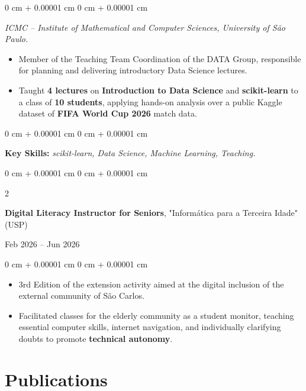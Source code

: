 \documentclass[10pt, letterpaper]{article}
\newenvironment{highlights}{
    \begin{itemize}[
        topsep=0.10 cm,
        parsep=0.10 cm,
        partopsep=0pt,
        itemsep=0pt,
        leftmargin=0 cm + 10pt
    ]
}{
    \end{itemize}
} %
\newenvironment{onecolentry}{
    \begin{adjustwidth}{
        0 cm + 0.00001 cm
    }{
        0 cm + 0.00001 cm
    }
}{
    \end{adjustwidth}
} %
\newenvironment{twocolentry}[2][]{
    \onecolentry
    \def\secondColumn{#2}
    \setcolumnwidth{\fill, 4.5 cm}
    \begin{paracol}{2}
}{
    \switchcolumn \raggedleft \secondColumn
    \end{paracol}
    \endonecolentry
} %
\begin{document}
\vspace{0.10 cm}
\begin{onecolentry}
    \textit{ICMC -- Institute of Mathematical and Computer Sciences, University of São Paulo.}
    \begin{highlights}
        \item Member of the Teaching Team Coordination of the DATA Group, responsible for planning and delivering introductory Data Science lectures.
        \item Taught \textbf{4 lectures} on \textbf{Introduction to Data Science} and \textbf{scikit-learn} to a class of \textbf{10 students}, applying hands-on analysis over a public Kaggle dataset of \textbf{FIFA World Cup 2026} match data.
    \end{highlights}
\end{onecolentry}
\vspace{0.10 cm}
\begin{onecolentry}
    \setlength{\leftskip}{0.3cm}
    {\footnotesize \textbf{Key Skills:} \textit{scikit-learn, Data Science, Machine Learning, Teaching.}}
\end{onecolentry}

\begin{twocolentry}{
    Feb 2026 – Jun 2026
}
    \textbf{Digital Literacy Instructor for Seniors}, "Informática para a Terceira Idade" (USP)
\end{twocolentry}

\vspace{0.10 cm}
\begin{onecolentry}
    \begin{highlights}
        \item 3rd Edition of the extension activity aimed at the digital inclusion of the external community of São Carlos.
        \item Facilitated classes for the elderly community as a student monitor, teaching essential computer skills, internet navigation, and individually clarifying doubts to promote \textbf{technical autonomy}.
    \end{highlights}
\end{onecolentry}

\vspace{0.15 cm}

\section{Publications}
\end{document}
